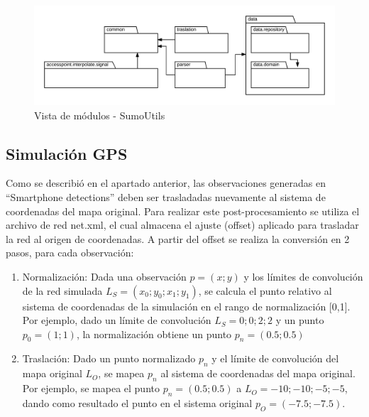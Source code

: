 \begin{figure}[!htp]
	\centering
	\includegraphics[width=\textwidth]{images/simulacion-general.png}
	\caption{Vista de módulos - SumoUtils}
    \label{fig:modulos-sim}
\end{figure}

\subsection{Simulación GPS}

Como se describió en el apartado anterior, las observaciones generadas en ``Smartphone detections'' deben ser trasladadas nuevamente al sistema de coordenadas del mapa original. Para realizar este post-procesamiento se utiliza el archivo de red net.xml, el cual almacena el ajuste (offset) aplicado para trasladar la red al origen de coordenadas. A partir del offset se realiza la conversión en 2 pasos, para cada observación:

\begin{enumerate}
    \item Normalización: Dada una observación $p=(x;y)$ y los límites de convolución de la red simulada $L_S=(x_0;y_0;x_1;y_1)$, se calcula el punto relativo al sistema de coordenadas de la simulación en el rango de normalización [0,1]. Por ejemplo, dado un límite de convolución  $L_S={0;0;2;2}$ y un punto $p_0 = (1;1)$, la normalización obtiene un punto $p_n = (0.5;0.5)$
    \item Traslación: Dado un punto normalizado $p_n$ y el límite de convolución del mapa original $L_{O}$, se mapea $p_n$ al sistema de coordenadas del mapa original. Por ejemplo, se mapea el punto $p_n = (0.5;0.5)$ a $L_{O}={-10;-10;-5;-5}$, dando como resultado el punto en el sistema original $p_O=(-7.5;-7.5)$.
\end{enumerate}

 
